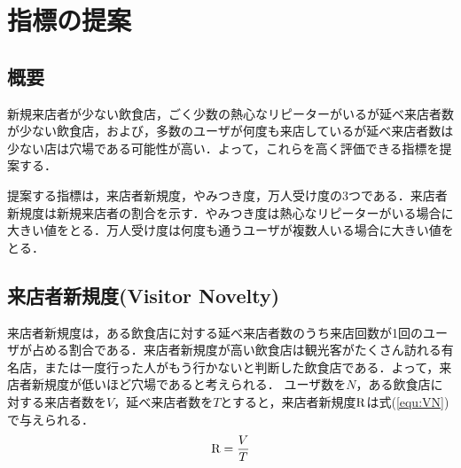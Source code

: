 \chapter{指標の提案}
\label{chap:proposal}

\section{概要}
新規来店者が少ない飲食店，ごく少数の熱心なリピーターがいるが延べ来店者数が少ない飲食店，および，多数のユーザが何度も来店しているが延べ来店者数は少ない店は穴場である可能性が高い．よって，これらを高く評価できる指標を提案する．\par
提案する指標は，来店者新規度，やみつき度，万人受け度の3つである．来店者新規度は新規来店者の割合を示す．やみつき度は熱心なリピーターがいる場合に大きい値をとる．万人受け度は何度も通うユーザが複数人いる場合に大きい値をとる．


\section{来店者新規度(Visitor Novelty)}

来店者新規度は，ある飲食店に対する延べ来店者数のうち来店回数が1回のユーザが占める割合である．来店者新規度が高い飲食店は観光客がたくさん訪れる有名店，または一度行った人がもう行かないと判断した飲食店である．よって，来店者新規度が低いほど穴場であると考えられる．
ユーザ数を$N$，ある飲食店に対する来店者数を$V$，延べ来店者数を$T$とすると，来店者新規度$\rm R$は式(\ref{equ:VN})で与えられる．
\begin{equation}
	\label{equ:VN}
	{\rm R} = \frac{V}{T}
\end{equation}


